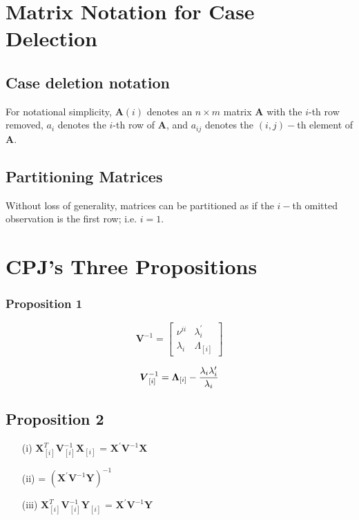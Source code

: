 \documentclass[12pt, a4paper]{report}
\theoremstyle{plain}
\theoremstyle{definition}
\theoremstyle{remark}
\begin{document}
\newpage
\section{Matrix Notation for Case Delection} %

\subsection{Case deletion notation} %

For notational simplicity, $\boldsymbol{A}(i)$ denotes an $n \times m$ matrix $\boldsymbol{A}$ with the $i$-th row
removed, $a_i$ denotes the $i$-th row of $\boldsymbol{A}$, and $a_{ij}$ denotes the $(i, j)-$th element of $\boldsymbol{A}$.

\subsection{Partitioning Matrices} %
Without loss of generality, matrices can be partitioned as if the $i-$th omitted observation is the first row; i.e. $i=1$.

\newpage
\section{CPJ's Three Propositions} %


\subsubsection{Proposition 1}

\[
\boldsymbol{V}^{-1} =
\left[ \begin{array}{cc}
\nu^{ii} & \lambda_{i}^{\prime}  \\
\lambda_{i} & \Lambda_{[i]}
\end{array}\right] \]


\[\boldsymbol{V}_{[i]}^{-1} = \boldsymbol{\Lambda}_{[i]} - { \lambda_{i} \lambda_{i} ^{\prime} \over \lambda_{i} } \]

\subsection{Proposition 2}

\begin{itemize}
\item[(i)] $ \boldsymbol{X}_{[i]}^{T}\boldsymbol{V}^{-1}_{[i]}\boldsymbol{X}_{[i]}$ = $\boldsymbol{X}^{\prime}\boldsymbol{V}^{-1}\boldsymbol{X}$
\item[(ii)] = $(\boldsymbol{X}^{\prime}\boldsymbol{V}^{-1}\boldsymbol{Y})^{-1}$
\item[(iii)] $ \boldsymbol{X}_{[i]}^{T}\boldsymbol{V}^{-1}_{[i]}\boldsymbol{Y}_{[i]}$ = $\boldsymbol{X}^{\prime}\boldsymbol{V}^{-1}\boldsymbol{Y}$
\end{itemize}
\end{document}

